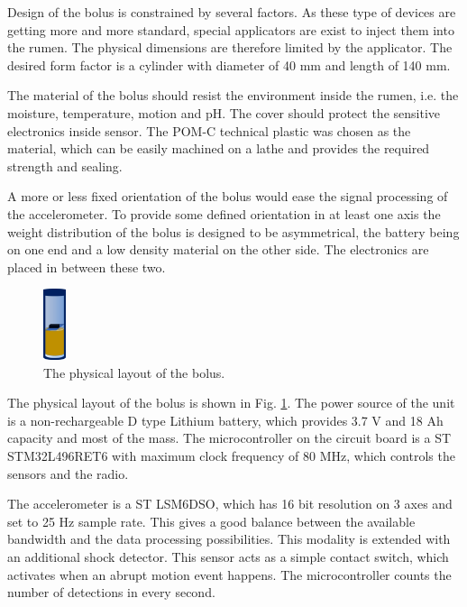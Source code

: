 \documentclass[conference]{IEEEtran}
\begin{document}
Design of the bolus is constrained by several factors. As these type
of devices are getting more and more standard, special applicators are
exist to inject them into the rumen. The physical dimensions are therefore
limited by the applicator. The desired form factor is a cylinder with
diameter of 40 mm and length of 140 mm.

The material of the bolus should resist the environment inside the rumen,
i.e. the moisture, temperature, motion and pH. The cover should protect
the sensitive electronics inside sensor. The POM-C technical plastic was
chosen as the material, which can be easily machined on a lathe and provides
the required strength and sealing.

A more or less fixed orientation of the bolus would ease the signal
processing of the accelerometer. To provide some defined orientation
in at least one axis the weight distribution of the bolus is designed
to be asymmetrical, the battery being on one end and a low density
material on the other side. The electronics are placed in between these two.

\begin{figure}[htbp]
  \centerline{\includegraphics[width=0.06\textwidth]{fig/bolus-physical-layout.png}}
  \caption{The physical layout of the bolus.}
  \label{bolus-physical-layout}
\end{figure}

The physical layout of the bolus is shown in Fig. \ref{bolus-physical-layout}.
The power source of the unit is a non-rechargeable D type Lithium battery,
which provides 3.7 V and 18 Ah capacity and most of the mass. The
microcontroller on the circuit board is a ST STM32L496RET6 with maximum
clock frequency of 80 MHz, which controls the
sensors and the radio.

The accelerometer is a ST LSM6DSO, which has 16 bit resolution on 3 axes and
set to 25 Hz sample rate. This gives a good balance between the available
bandwidth and the data processing possibilities. This modality is extended
with an additional shock detector. This sensor acts as a simple contact switch,
which activates when an abrupt motion event happens. The microcontroller
counts the number of detections in every second.
\end{document}
